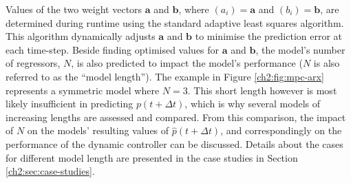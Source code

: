 Values of the two weight vectors $\textbf{a}$ and $\textbf{b}$, where $(a_i) = \textbf{a}$ and $(b_i) = \textbf{b}$, are determined during runtime using the standard adaptive least squares algorithm.
This algorithm dynamically adjusts $\textbf{a}$ and $\textbf{b}$ to minimise the prediction error at each time-step.
Beside finding optimised values for $\textbf{a}$ and $\textbf{b}$, the model's number of regressors, $N$, is also predicted to impact the model's performance ($N$ is also referred to as the ``model length'').
The example in Figure \ref{ch2:fig:mpc-arx} represents a symmetric model where $N=3$.
This short length however is most likely insufficient in predicting $p(t+\Delta t)$, which is why several models of increasing lengths are assessed and compared.
From this comparison, the impact of $N$ on the models' resulting values of $\hat{p}(t+\Delta t)$, and correspondingly on the performance of the dynamic controller can be discussed.
Details about the cases for different model length are presented in the case studies in Section \ref{ch2:sec:case-studies}.










